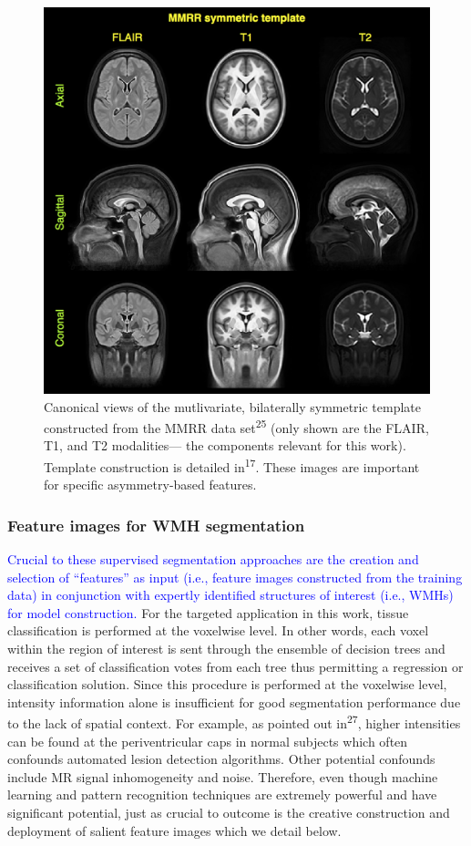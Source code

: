\documentclass[11pt,]{article}
\begin{document}
\begin{figure}[htbp]
\centering
\includegraphics{Figures/MMRR.png}
\caption{Canonical views of the mutlivariate, bilaterally symmetric
template constructed from the MMRR data set\textsuperscript{25} (only
shown are the FLAIR, T1, and T2 modalities--- the components relevant
for this work). Template construction is detailed
in\textsuperscript{17}. These images are important for specific
asymmetry-based features.}
\end{figure}

\subsubsection{Feature images for WMH
segmentation}\label{feature-images-for-wmh-segmentation}

\textcolor{blue}{
Crucial to these supervised segmentation approaches are the creation and selection of
``features'' as input (i.e., feature images constructed from the training data)
in conjunction with expertly identified structures of interest
(i.e., WMHs) for model construction.} For the targeted application in
this work, tissue classification is performed at the voxelwise level. In
other words, each voxel within the region of interest is sent through
the ensemble of decision trees and receives a set of classification
votes from each tree thus permitting a regression or classification
solution. Since this procedure is performed at the voxelwise level,
intensity information alone is insufficient for good segmentation
performance due to the lack of spatial context. For example, as pointed
out in\textsuperscript{27}, higher intensities can be found at the
periventricular caps in normal subjects which often confounds automated
lesion detection algorithms. Other potential confounds include MR signal
inhomogeneity and noise. Therefore, even though machine learning and
pattern recognition techniques are extremely powerful and have
significant potential, just as crucial to outcome is the creative
construction and deployment of salient feature images which we detail
below.
\end{document}
